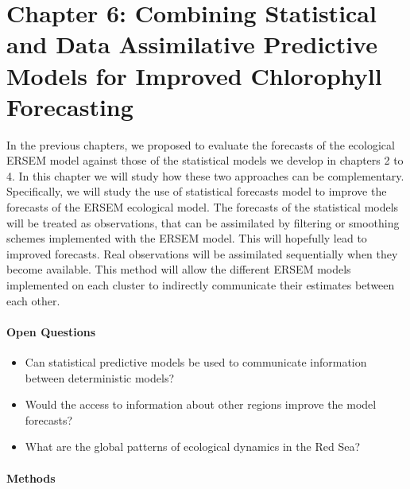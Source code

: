 \section{Chapter 6: Combining Statistical and Data Assimilative Predictive
Models for Improved Chlorophyll Forecasting}

In the previous chapters, we proposed to evaluate the forecasts of the
ecological ERSEM model against those of the statistical models we develop in
chapters 2 to 4. In this chapter we will study how these two approaches can be
complementary. Specifically, we will study the use of statistical forecasts
model to improve the forecasts of the ERSEM ecological model. The forecasts of
the statistical models will be treated as observations, that can be assimilated
by filtering or smoothing schemes implemented with the ERSEM model. This will
hopefully lead to improved forecasts. Real observations will be assimilated
sequentially when they become available. This method will allow the different
ERSEM models implemented on each cluster to indirectly communicate their
estimates between each other.

\paragraph{Open Questions}

\begin{itemize}

\item Can statistical predictive models be used to communicate information
between deterministic models?

\item Would the access to information about other regions improve the model
forecasts?

\item What are the global patterns of ecological dynamics in the Red Sea?

\end{itemize}

\paragraph{Methods}

